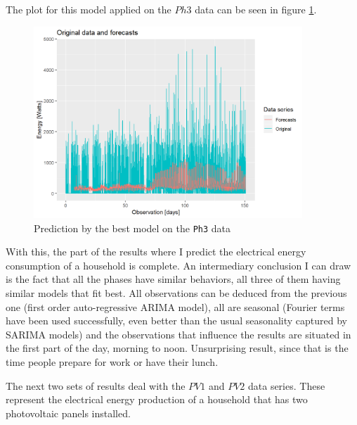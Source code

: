 \documentclass[12pt,a4paper,titlepage]{report}
\begin{document}
The plot for this model applied on the $ Ph3 $ data can be seen in figure \ref{dbestph3}.

\begin{figure}[htbp]
    \centering
    \includegraphics[width=0.9\textwidth]{dbestph3}
    \caption{Prediction by the best model on the \texttt{Ph3} data}
    \label{dbestph3}
\end{figure}

With this, the part of the results where I predict the electrical energy consumption of a household is complete. An intermediary conclusion I can draw is the fact that all the phases have similar behaviors, all three of them having similar models that fit best. All observations can be deduced from the previous one (first order auto-regressive ARIMA model), all are seasonal (Fourier terms have been used successfully, even better than the usual seasonality captured by SARIMA models) and the observations that influence the results are situated in the first part of the day, morning to noon. Unsurprising result, since that is the time people prepare for work or have their lunch.

The next two sets of results deal with the $PV1 $ and $ PV2 $ data series. These represent the electrical energy production of a household that has two photovoltaic panels installed.
\end{document}
